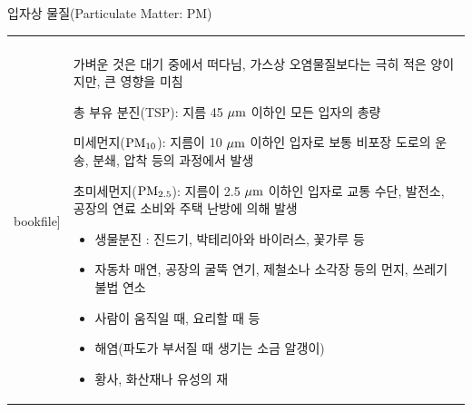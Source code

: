 \begin{frame}[t]{입자상 물질(Particulate Matter: PM)}
	\begin{tabular}{ll}
		\begin{minipage}[t]{0.4\textwidth}\scriptsize
			\begin{figure}[t]
				\texttt{[image: \\bookfile]}
			\end{figure}
		\end{minipage}	
		&
		\begin{minipage}[t]{0.55\textwidth} \scriptsize	
			가벼운 것은 대기 중에서 떠다님, 가스상 오염물질보다는 극히 적은 양이지만, 큰 영향을 미침

			총 부유 분진(TSP): 지름 45 $\rm{\mu m}$ 이하인 모든 입자의 총량

			미세먼지($\rm{{PM}_{10}}$): 지름이 10 $\rm{\mu m}$ 이하인 입자로 보통 비포장 도로의 운송, 분쇄, 압착 등의 과정에서 발생

			초미세먼지($\rm{{PM}_{2.5}}$): 지름이 2.5 $\rm{\mu m}$ 이하인 입자로 교통 수단, 발전소, 공장의 연료 소비와 주택 난방에 의해 발생
	
		\begin{itemize}
				\item 생물분진 : 진드기, 박테리아와 바이러스, 꽃가루 등
				\item 자동차 매연, 공장의 굴뚝 연기, 제철소나 소각장 등의 먼지, 쓰레기 불법 연소
				\item 사람이 움직일 때, 요리할 때 등
				\item 해염(파도가 부서질 때 생기는 소금 알갱이)
				\item 황사, 화산재나 유성의 재
									
			\end{itemize}

		\end{minipage}
	\end{tabular}
\end{frame}



